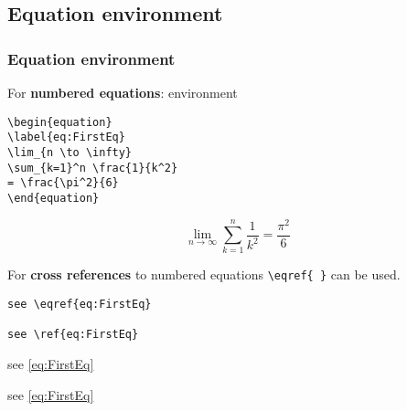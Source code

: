 \subsection{Equation environment}
\begin{frame}[fragile]
\frametitle{Equation environment}


For \textbf{numbered equations}:  environment

\begin{multicols}{2}
	
\begin{lstlisting}
\begin{equation}
\label{eq:FirstEq}
\lim_{n \to \infty}
\sum_{k=1}^n \frac{1}{k^2}
= \frac{\pi^2}{6}
\end{equation}
\end{lstlisting}

\columnbreak

\begin{equation}
\label{eq:FirstEq}
\lim_{n \to \infty}
\sum_{k=1}^n \frac{1}{k^2}
= \frac{\pi^2}{6}
\end{equation}

\end{multicols}

\pause 

For \textbf{cross references} to numbered equations \lstinline|\eqref{ }| can be used.

\begin{multicols}{2}
	
\begin{lstlisting}
see \eqref{eq:FirstEq}

see \ref{eq:FirstEq}
\end{lstlisting}

\columnbreak

see \eqref{eq:FirstEq}

see \ref{eq:FirstEq}

\end{multicols}

\end{frame}


